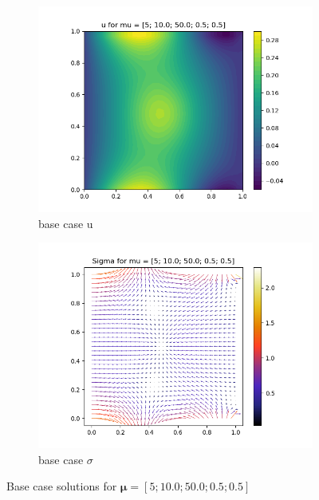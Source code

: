 \begin{figure}[!h]
        \begin{center}
	\begin{subfigure}{0.35\linewidth}
		\centering
		\includegraphics[width=\linewidth]{figs/mixed_u_base.png}
            \caption{base case u}
		\label{fig: base_u}
	\end{subfigure}
	\begin{subfigure}{0.35\linewidth}
		\centering
		\includegraphics[width=\linewidth]{figs/mixed_sigma_base.png}
            \caption{base case $\sigma$}
		\label{fig: base_sig}
	\end{subfigure}
	\caption{Base case solutions for $\bm{\mu} = [5; 10.0; 50.0; 0.5; 0.5]$}
	\label{fig: base}
        \end{center}
\end{figure}
